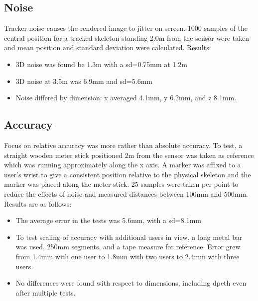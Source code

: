 \documentclass[a4paper,10pt]{report}
\begin{document}
\subsection{Noise}
Tracker noise causes the rendered image to jitter on screen. 1000 samples of the central position for a tracked skeleton standing 2.0m from the sensor were taken and mean position and standard deviation were calculated.\newline
Results:
\begin{itemize}
 \item 3D noise was found be 1.3m with a sd=0.75mm at 1.2m
 \item 3D noise at 3.5m was 6.9mm and sd=5.6mm
 \item Noise differed by dimension: x averaged 4.1mm, y 6.2mm, and z 8.1mm.
\end{itemize}

\subsection{Accuracy}
Focus on relative accuracy was more rather than absolute accuracy. To test, a straight wooden meter stick positioned 2m from the sensor was taken as reference which was running approximately along the x axis. A marker was affixed to a user’s wrist to give a consistent position relative to the physical skeleton and the marker was placed along the meter stick. 25 samples were taken per point to reduce the effects of noise and measured distances between 100mm and 500mm. \newline
Results are as follows:
\begin{itemize}
 \item The average error in the tests was 5.6mm, with a sd=8.1mm
 \item To test scaling of accuracy with additional users in view, a long metal bar was used, 250mm segments, and a tape measure for reference. Error grew from 1.4mm with one user to 1.8mm with two users to 2.4mm with three users.
 \item No differences were found with respect to dimensions, including dpeth even after multiple tests.
\end{itemize}
\end{document}
